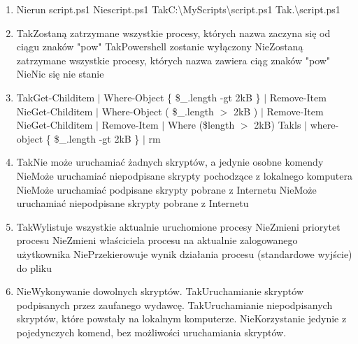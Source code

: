 \begin{enumerate}
		\newpage
		\item {}%
		{Nie}{run script.ps1}%
		{Nie}{script.ps1}%
		{Tak}{C:\textbackslash MyScripts\textbackslash script.ps1}%
		{Tak}{.\textbackslash script.ps1}
		\item {}%
		{Tak}{Zostaną zatrzymane wszystkie procesy, których nazwa zaczyna się od ciągu znaków "pow"}%
		{Tak}{Powershell zostanie wyłączony}%
		{Nie}{Zostaną zatrzymane wszystkie procesy, których nazwa zawiera ciąg znaków "pow"}%
		{Nie}{Nic się nie stanie}
		\item {}%
		{Tak}{Get-Childitem $ \mid $ Where-Object \{ \$\_.length -gt 2kB \} $ \mid $ Remove-Item}%
		{Nie}{Get-Childitem $ \mid $ Where-Object ( \$\_.length $ > $ 2kB ) $ \mid $ Remove-Item}%
		{Nie}{Get-Childitem $ \mid $ Remove-Item $ \mid $ Where (\$length $ > $ 2kB)}%
		{Tak}{ls $ \mid $ where-object \{ \$\_.length -gt 2kB \} $ \mid $ rm}
		\item {}%
		{Tak}{Nie może uruchamiać żadnych skryptów, a jedynie osobne komendy}%
		{Nie}{Może uruchamiać niepodpisane skrypty pochodzące z lokalnego komputera}%
		{Nie}{Może uruchamiać podpisane skrypty pobrane z Internetu}%
		{Nie}{Może uruchamiać niepodpisane skrypty pobrane z Internetu}
		\item {}%
		{Tak}{Wylistuje wszystkie aktualnie uruchomione procesy}%
		{Nie}{Zmieni priorytet procesu}%
		{Nie}{Zmieni właściciela procesu na aktualnie zalogowanego użytkownika}%
		{Nie}{Przekierowuje wynik działania procesu (standardowe wyjście) do pliku}
		\item {}%
		{Nie}{Wykonywanie dowolnych skryptów.}%
		{Tak}{Uruchamianie skryptów podpisanych przez zaufanego wydawcę.}%
		{Tak}{Uruchamianie niepodpisanych skryptów, które powstały na lokalnym komputerze.}%
		{Nie}{Korzystanie jedynie z pojedynczych komend, bez możliwości uruchamiania skryptów.}
		

\end{enumerate}
